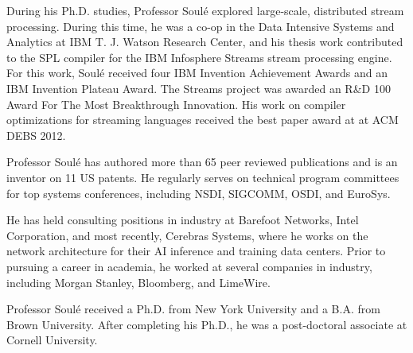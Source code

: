 \documentclass[11pt]{article}
\begin{document}
During his Ph.D. studies, Professor Soul\'{e} explored large-scale,
distributed stream processing. During this time, he was a co-op in the
Data Intensive Systems and Analytics at IBM T. J. Watson Research
Center, and his thesis work contributed to the SPL compiler for the
IBM Infosphere Streams stream processing engine. For this work,
Soul\'{e} received four IBM Invention Achievement Awards and an IBM
Invention Plateau Award. The Streams project was awarded an R\&D 100
Award For The Most Breakthrough Innovation.  His work on compiler
optimizations for streaming languages received the best paper award at
at ACM DEBS 2012.



Professor Soul\'{e} has authored more than 65 peer reviewed publications and is
an inventor on 11 US patents. He regularly serves on technical program committees for top systems
conferences, including NSDI, SIGCOMM, OSDI, and EuroSys. %


He has held consulting positions in industry at Barefoot Networks,
Intel Corporation, and most recently, Cerebras Systems, where he works
on the network architecture for their AI inference and training data
centers.  Prior to pursuing a career in academia, he worked at several
companies in industry, including Morgan Stanley, Bloomberg, and
LimeWire.



Professor Soul\'{e} received a Ph.D. from New York University and a
B.A. from Brown University. After completing his Ph.D., he was a
post-doctoral associate at Cornell University.
\end{document}
